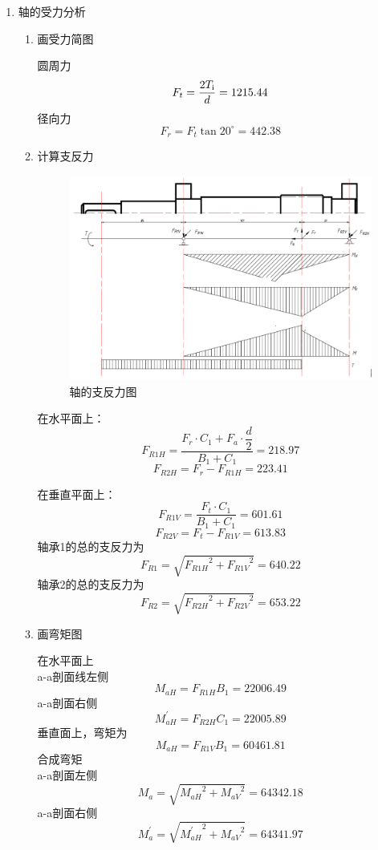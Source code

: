 \begin{enumerate}[A]
	\item 轴的受力分析
	\begin{enumerate}[a]
		\item 画受力简图
		\par 圆周力 $$F_t=\frac{2T_{\mathrm{{\uppercase\expandafter{\romannumeral1}}}}}{d}=1215.44$$
		径向力 $$F_r=F_t\tan{20^{\circ}}=442.38$$
		\item 计算支反力 
		\begin{figure}[H]
			\begin{center}
				\includegraphics[width=\textwidth]{pic/jiaohe1.png}
				\caption{轴\uppercase\expandafter{}的支反力图}
			\end{center}
		\end{figure}
		\par 在水平面上：
		$$F_{R1H}=\dfrac{F_r\cdot C_1+F_a\cdot \dfrac{d}{2}}{B_1+C_1}=218.97$$
		$$F_{R2H}=F_r-F_{R1H}=223.41$$
		\par 在垂直平面上：
		$$F_{R1V}=\dfrac{F_t\cdot C_1}{B_1+C_1}=601.61$$
		$$F_{R2V}=F_t-F_{R1V}=613.83$$
		轴承1的总的支反力为
		$$F_{R1}=\sqrt{{F_{R1H}}^2+{F_{R1V}}^2}=640.22$$
		轴承2的总的支反力为
		$$F_{R2}=\sqrt{{F_{R2H}}^2+{F_{R2V}}^2}=653.22$$
		\item 画弯矩图
		\par 在水平面上 \\
		a-a剖面线左侧\\
		$$M_{aH}=F_{R1H}B_1=22006.49$$
		a-a剖面右侧 \\
		$$M^{\prime}_{aH}=F_{R2H}C_1=22005.89$$
		垂直面上，弯矩为\\
		$$M_{aH}=F_{R1V}B_1=60461.81$$
		合成弯矩\\
		a-a剖面左侧\\
		$$M_a=\sqrt{{M_{aH}}^2+{M_{aV}}^2}=64342.18$$
		a-a剖面右侧\\
		$$M^{\prime}_a=\sqrt{{M^{\prime}_{aH}}^2+{M_{aV}}^2}=64341.97$$
		

\end{enumerate}
\end{enumerate}
